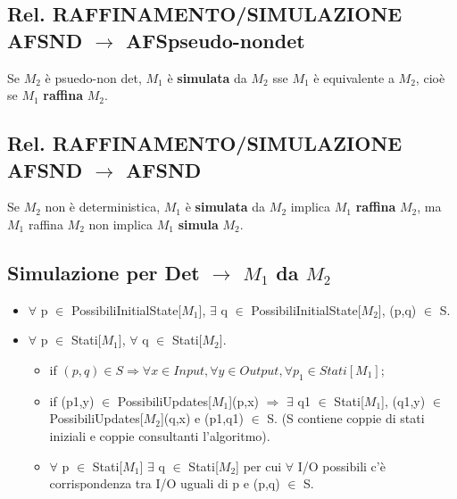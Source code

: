 \documentclass[a4paper, 11pt]{article}
\begin{document}
\subsection{Rel. RAFFINAMENTO/SIMULAZIONE AFSND $\rightarrow$ AFSpseudo-nondet} Se $M_2$ è psuedo-non det, $M_1$ è \textbf{simulata} da $M_2$ sse $M_1$ è equivalente a $M_2$, cioè se $M_1$ \textbf{raffina} $M_2$.
\subsection{Rel. RAFFINAMENTO/SIMULAZIONE AFSND $\rightarrow$ AFSND} Se $M_2$ non è deterministica, $M_1$ è \textbf{simulata} da $M_2$ implica $M_1$ \textbf{raffina} $M_2$, ma $M_1$ raffina $M_2$ non implica $M_1$ \textbf{simula} $M_2$.
\subsection{Simulazione per Det $\rightarrow$ $M_1$ da $M_2$}
\begin{itemize}
\item $\forall$ p $\in$  PossibiliInitialState[$M_1$], $\exists$ q $\in$ PossibiliInitialState[$M_2$], (p,q) $\in$ S.
\item $\forall$ p $\in$  Stati[$M_1$], $\forall$ q $\in$ Stati[$M_2$].
\begin{itemize}
\item if $(p,q) \in S \Rightarrow \forall x \in Input, \forall y \in Output, \forall p_1 \in  Stati[M_1]$;
\item if (p1,y) $\in$ PossibiliUpdates[$M_1$](p,x) $\Rightarrow$ $\exists$ q1 $\in$ Stati[$M_1$], (q1,y) $\in$ PossibiliUpdates[$M_2$](q,x) e (p1,q1) $\in$ S. (S contiene coppie di stati iniziali e coppie consultanti l'algoritmo).
\item $\forall$ p $\in$ Stati[$M_1$] $\exists$ q $\in$ Stati[$M_2$] per cui $\forall$ I/O possibili c'è corrispondenza tra I/O uguali di p e (p,q) $\in$ S. 
\end{itemize}
\end{itemize}
\end{document}
